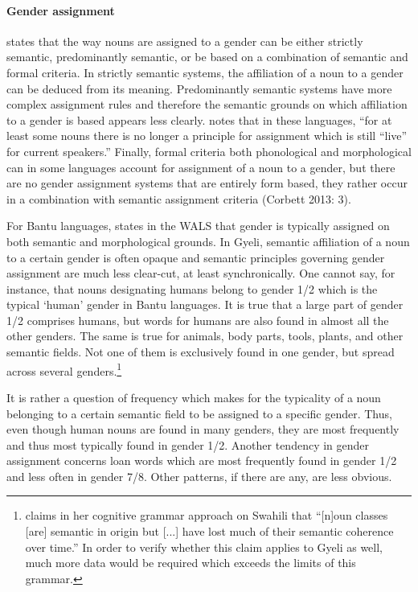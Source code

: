 \paragraph{Gender assignment} \citet{wals-32} states that the way nouns are assigned to a gender can be either strictly semantic, predominantly semantic, or be based on a combination of semantic and formal criteria. In strictly semantic systems, the affiliation of a noun to a gender can be deduced from its meaning. Predominantly semantic systems have more complex assignment rules and therefore the semantic grounds on which affiliation to a gender is based appears less clearly. \citet[2]{wals-32} notes that in these languages, ``for at least some nouns there is no longer a principle for assignment which is still ``live'' for current speakers.'' %
Finally, formal criteria both phonological and morphological can in some languages account for assignment of a noun to a gender, but there are no gender assignment systems that are entirely form based, they rather occur in a combination with semantic assignment criteria (Corbett 2013: 3).


For Bantu languages, \citet[map 32]{wals-32} states in the WALS that gender is typically assigned on both semantic and morphological grounds.
In Gyeli, semantic affiliation of a noun to a certain gender is often opaque and semantic principles governing gender assignment are much less clear-cut, at least synchronically. One cannot say, for instance, that nouns designating humans belong to gender 1/2 which is the typical `human' gender in Bantu languages. It is true that a large part of gender 1/2 comprises humans, but words for humans are also found in almost all the other genders. The same is true for animals, body parts, tools, plants, and other semantic fields. Not one of them is exclusively found in one gender, but spread across several genders.\footnote{\citet[3]{contini2000}  claims in her cognitive grammar approach on Swahili that ``[n]oun classes [are] semantic in origin but [...] have lost much of their semantic coherence over time.'' In order to verify whether this claim applies to Gyeli as well, much more data would be required which exceeds the limits of this grammar.}

It is rather a question of frequency which makes for the typicality of a noun belonging to a certain semantic field to be assigned to a specific gender. Thus, even though human nouns are found in many genders, they are most frequently and thus most typically found in gender 1/2.  
Another tendency in gender assignment concerns loan words which are most frequently found in gender 1/2 and less often in gender 7/8.
 Other patterns, if there are any, are less obvious.

